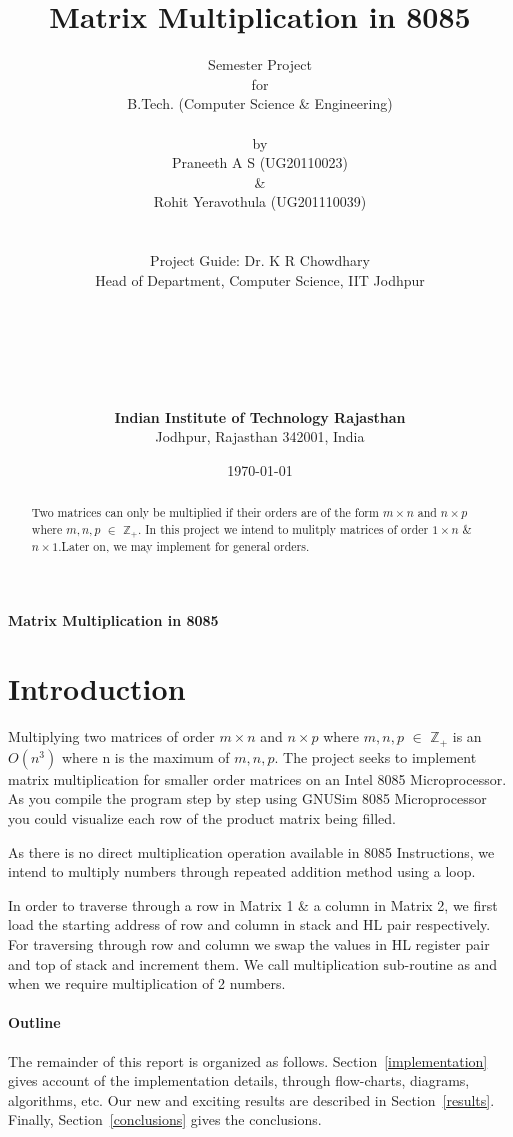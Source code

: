 \documentclass[12pt]{article}
\title{Matrix Multiplication in 8085}%
\author{
        Semester Project \\
         for \\
         B.Tech. (Computer Science \& Engineering)\\  
                  \\
               by \\ 
        Praneeth A S (UG20110023)\\
             \&\\
        Rohit Yeravothula (UG201110039)\\
                 \\
                 \\
              Project Guide:
              Dr. K R Chowdhary\\
            Head of Department, Computer Science, IIT Jodhpur\\
                 \\
                 \\
                  \\
                  \\
                   \\
                    \\
        \textbf{Indian Institute of Technology Rajasthan}\\
        Jodhpur, Rajasthan 342001,  India    \\  
}
\date{\today}
\begin{document}
\maketitle


\newpage

\begin{center}
\textbf{\Large{Matrix Multiplication in 8085}}
\end{center}

\begin{abstract}
Two matrices can only be multiplied if their orders are of the form $m \times n$ and $n \times p$ where $m,n,p$ $\in$ $\mathbb{Z}_+$. In this project we intend to mulitply matrices of order $1 \times n$ \& $n \times 1$.Later on, we may implement for general orders.
\end{abstract}

\section{Introduction}
 Multiplying two matrices of order $m \times n$ and $n \times p$ where $m,n,p$ $\in$ $\mathbb{Z}_+$ is an $O(n^3)$ where n is the maximum of $m,n,p$. The project seeks to implement matrix multiplication for smaller order matrices on an Intel 8085 Microprocessor. As you compile the program step by step using GNUSim 8085 Microprocessor you could visualize each row of the product matrix being filled.
 
 As there is no direct multiplication operation available in 8085 Instructions, we intend to multiply numbers through repeated addition method using a loop.
 
 In order to traverse through a row in Matrix 1 \& a column in Matrix 2, we first load the starting address of row and column in stack and HL pair respectively. For traversing through row and column we swap the values in HL register pair and top of stack and increment them. We call multiplication sub-routine as and when we require multiplication of 2 numbers.
 

\paragraph{Outline}
The remainder of this report is organized as follows.
Section~\ref{implementation} gives account of the implementation details, through flow-charts, diagrams, algorithms, etc.
Our new and exciting results are described in Section~\ref{results}.
Finally, Section~\ref{conclusions} gives the conclusions.
\end{document}
